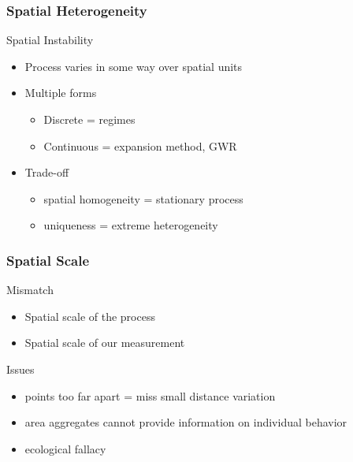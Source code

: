 \documentclass[nototal,handout]{beamer}
\begin{document}
\begin{frame}
  \frametitle{Spatial Heterogeneity}
  \begin{block}{Spatial Instability}
    \begin{itemize}
      \item Process varies in some way over spatial units
      \item Multiple forms
	\begin{itemize}
	  \item Discrete = regimes
	  \item Continuous = expansion method, GWR
	\end{itemize}
      \item Trade-off
	\begin{itemize}
	  \item spatial homogeneity = stationary process
	  \item uniqueness = extreme heterogeneity
	\end{itemize}
    \end{itemize}
   \end{block}
 \end{frame}

 \begin{frame}
   \frametitle{Spatial Scale}
   \begin{block}{Mismatch}
     \begin{itemize}
       \item Spatial scale of the process
       \item Spatial scale of our measurement
     \end{itemize}
    \end{block}
\begin{block}{Issues}
     \begin{itemize}
       \item points too far apart = miss small distance variation
       \item area aggregates cannot provide information on individual
	 behavior
       \item ecological fallacy
     \end{itemize}
    \end{block}

  \end{frame}
 
\end{document}

